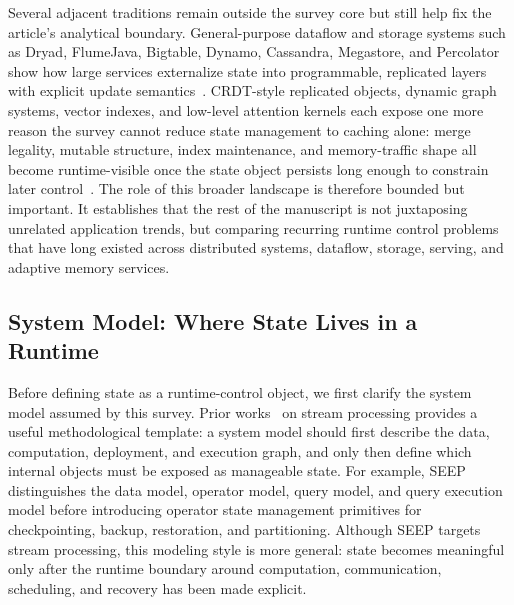 \documentclass[acmsmall,screen,review]{acmart}
\begin{document}
Several adjacent traditions remain outside the survey core but still help fix the article's analytical boundary. General-purpose dataflow and storage systems such as Dryad, FlumeJava, Bigtable, Dynamo, Cassandra, Megastore, and Percolator show how large services externalize state into programmable, replicated layers with explicit update semantics~\cite{isard2007dryad,chambers2010flumejava,murray2011ciel,chang2008bigtable,decandia2007dynamo,lakshman2010cassandra,baker2011megastore,peng2010percolator}. CRDT-style replicated objects, dynamic graph systems, vector indexes, and low-level attention kernels each expose one more reason the survey cannot reduce state management to caching alone: merge legality, mutable structure, index maintenance, and memory-traffic shape all become runtime-visible once the state object persists long enough to constrain later control~\cite{shapiro2011crdt,gao2026grace,karpukhin2020dpr,khattab2020colbert,jegou2011pq,malkov2020hnsw,dao2024flashattention2}. The role of this broader landscape is therefore bounded but important. It establishes that the rest of the manuscript is not juxtaposing unrelated application trends, but comparing recurring runtime control problems that have long existed across distributed systems, dataflow, storage, serving, and adaptive memory services.


\subsection{System Model: Where State Lives in a Runtime}

Before defining state as a runtime-control object, we first clarify the system model assumed by this survey. Prior works~\cite{fernandez2010seep, mao2025spacker, carbone2015flink} on stream processing provides a useful methodological template: a system model should first describe the data, computation, deployment, and execution graph, and only then define which internal objects must be exposed as manageable state. For example, SEEP~\cite{fernandez2013osm} distinguishes the data model, operator model, query model, and query execution model before introducing operator state management primitives for checkpointing, backup, restoration, and partitioning. Although SEEP targets stream processing, this modeling style is more general: state becomes meaningful only after the runtime boundary around computation, communication, scheduling, and recovery has been made explicit.
\end{document}
